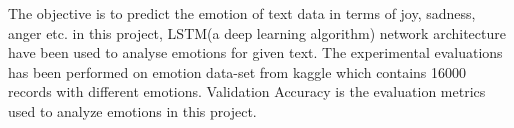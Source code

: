The objective is to predict the emotion of text data in terms of joy, sadness, anger etc. in this project, LSTM(a deep learning algorithm) network architecture have been used to analyse emotions for given text. The experimental evaluations has been performed on emotion data-set from kaggle which contains 16000 records with different emotions. Validation Accuracy is the evaluation metrics used to analyze emotions in this project.
\endinput
